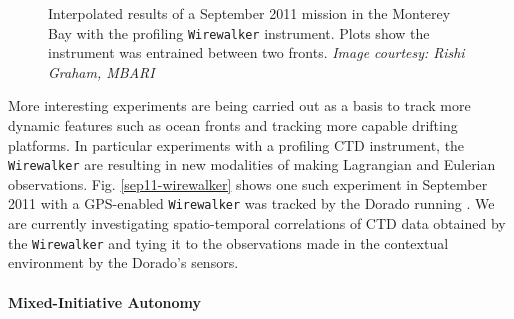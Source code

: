 \begin{figure}
\caption{\small Interpolated results of a September 2011 \rx mission
  in the Monterey Bay with the profiling \texttt{Wirewalker}
  \cite{rainville01,pinkel11} instrument. Plots show the instrument
  was entrained between two fronts. \emph{Image courtesy: Rishi
    Graham, MBARI}}
  \label{fig:sept11-wirewalker}
\end{figure}

More interesting experiments are being carried out as a basis to track
more dynamic features such as ocean fronts \cite{fronts11} and
tracking more capable drifting platforms. In particular experiments
with a profiling CTD instrument, the \texttt{Wirewalker}
\cite{rainville01,pinkel11} are resulting in new modalities of making
Lagrangian and Eulerian observations. Fig. \ref{sep11-wirewalker}
shows one such experiment in September 2011 with a GPS-enabled
\texttt{Wirewalker} was tracked by the Dorado running \rxe. We are
currently investigating spatio-temporal correlations \cite{gneiting07}
of CTD data obtained by the \texttt{Wirewalker} and tying it to the
observations made in the contextual environment by the Dorado's
sensors.

\paragraph {Mixed-Initiative Autonomy}

